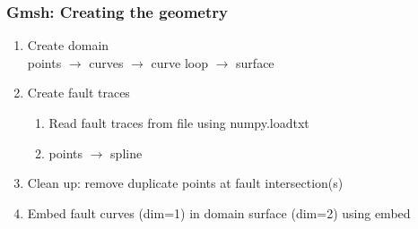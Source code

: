 \documentclass[aspectratio=169]{beamer}
\begin{document}
\begin{frame}
  \frametitle{Gmsh: Creating the geometry}
  \summary{}
  
  \begin{enumerate}
  \item Create domain\\
    points $\rightarrow$ curves $\rightarrow$ curve loop $\rightarrow$ surface\pause
  \item Create fault traces
    \begin{enumerate}
    \item Read fault traces from file using {\ttfamily numpy.loadtxt}
    \item points $\rightarrow$ spline
    \end{enumerate}\pause
  \item Clean up: remove duplicate points at fault intersection(s)\pause
  \item Embed fault curves (dim=1) in domain surface (dim=2) using {\ttfamily embed}
  \end{enumerate}
  
\end{frame}
\end{document}
